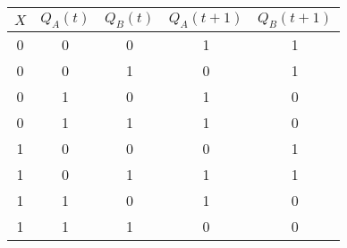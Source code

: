 \documentclass{article}
\begin{document}
    \begin{center}
        \begin{tabular}{|c|c|c|c|c|}
            \hline
            $X$ & $Q_A(t)$ & $Q_B(t)$ & $Q_A(t+1)$ & $Q_B(t+1)$ \\
            \hline
            0 & 0 & 0 & 1 & 1 \\
            0 & 0 & 1 & 0 & 1 \\
            0 & 1 & 0 & 1 & 0 \\
            0 & 1 & 1 & 1 & 0 \\
            1 & 0 & 0 & 0 & 1 \\
            1 & 0 & 1 & 1 & 1 \\
            1 & 1 & 0 & 1 & 0 \\
            1 & 1 & 1 & 0 & 0 \\
            \hline
        \end{tabular}
    \end{center}
\end{document}
